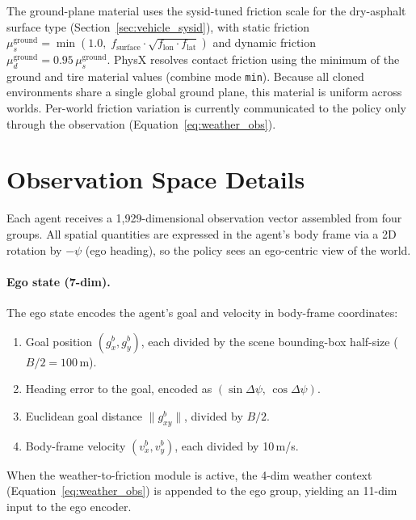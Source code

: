 The ground-plane material uses the sysid-tuned friction scale for the dry-asphalt surface type (Section~\ref{sec:vehicle_sysid}), with static friction $\mu^{\mathrm{ground}}_s = \min(1.0,\; f_{\mathrm{surface}} \cdot \sqrt{f_{\mathrm{lon}} \cdot f_{\mathrm{lat}}})$ and dynamic friction $\mu^{\mathrm{ground}}_d = 0.95\,\mu^{\mathrm{ground}}_s$.
PhysX resolves contact friction using the minimum of the ground and tire material values (combine mode \texttt{min}).
Because all cloned environments share a single global ground plane, this material is uniform across worlds.
Per-world friction variation is currently communicated to the policy only through the observation (Equation~\ref{eq:weather_obs}).



\section{Observation Space Details}
\label{app:observations}

Each agent receives a 1{,}929-dimensional observation vector assembled from four groups.
All spatial quantities are expressed in the agent's body frame via a 2D rotation by $-\psi$ (ego heading), so the policy sees an ego-centric view of the world.

\paragraph{Ego state (7-dim).}
The ego state encodes the agent's goal and velocity in body-frame coordinates:
\begin{enumerate}[leftmargin=*, itemsep=1pt]
  \item Goal position $(g_x^b, g_y^b)$, each divided by the scene bounding-box half-size ($B/2 = 100$\,m).
  \item Heading error to the goal, encoded as $(\sin\Delta\psi,\,\cos\Delta\psi)$.
  \item Euclidean goal distance $\|g^b_{xy}\|$, divided by $B/2$.
  \item Body-frame velocity $(v_x^b, v_y^b)$, each divided by 10\,m/s.
\end{enumerate}
When the weather-to-friction module is active, the 4-dim weather context (Equation~\ref{eq:weather_obs}) is appended to the ego group, yielding an 11-dim input to the ego encoder.

